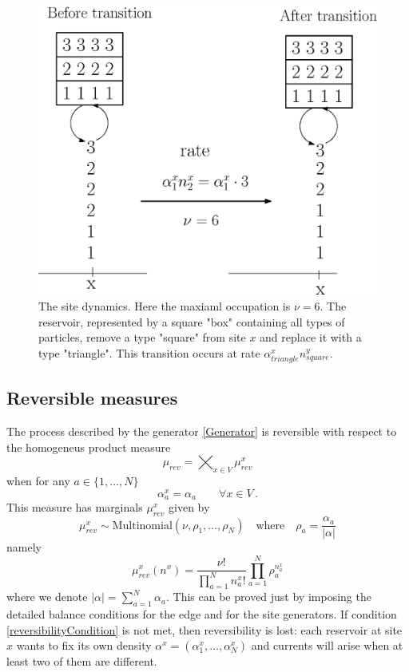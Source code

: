 \documentclass[10pt]{article}
\numberwithin{equation}{section}
\numberwithin{equation}{subsection}
\newcommand{\twoj}{\nu}
\begin{document}
\begin{figure}
    \centering
    \includegraphics[scale=0.4]{BoundaryStirring.eps}
    \caption{The site dynamics. Here the maxiaml occupation is $\nu=6$. The reservoir, represented by a square "box" containing all types of particles, remove a type "square" from site $x$ and replace it with a type "triangle". This transition occurs at rate $\alpha_{triangle}^{x}n_{square}^{y}$.}
    \label{fig:2}
\end{figure}
\subsection{Reversible measures}
The process described by the generator \eqref{Generator} is reversible with respect to the homogeneus product measure \begin{equation}\label{reversibleMeasure}
\mu_{rev}=\bigtimes_{x\in V}\mu_{rev}^{x}
\end{equation}
when for any $a\in\{1,\ldots,N\}$
\begin{equation}\label{reversibilityCondition}
\alpha_{a}^{x}=\alpha_{a}\qquad \forall x\in V\,.
\end{equation}
This measure has marginals $\mu_{rev}^{x}$ given by 
\begin{equation}
 \mu^{x}_{rev}\sim \text{Multinomial}\left(\twoj,\rho_{1},\ldots,\rho_{N}\right)\quad \text{where}\quad \rho_{a}=\frac{\alpha_{a}}{|\alpha|}
\end{equation}
namely
\begin{equation}
\mu_{rev}^{x}(n^{x})=\frac{\nu!}{\prod_{a=1}^{N}n_{a}^{x}!}\prod_{a=1}^{N}\rho_{a}^{n_{a}^{x}}
\end{equation}
where we denote $|\alpha|=\sum_{a=1}^{N}\alpha_{a}$. 
This can be proved just by imposing the detailed balance conditions for the edge and for the site generators. If condition \eqref{reversibilityCondition} is not met, then reversibility is lost: each reservoir at site $x$ wants to fix its own density $\alpha^{x}=(\alpha_{1}^{x},\ldots,\alpha_{N}^{x})$ and currents will arise when at least two of them are different. 
\end{document}
